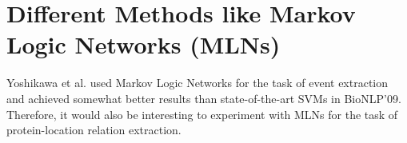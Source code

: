 \section{Different Methods like Markov Logic Networks (MLNs)}


Yoshikawa et al. used Markov Logic Networks \cite{yoshikawa2011coreference} for the task of event extraction and achieved somewhat better results than state-of-the-art SVMs in BioNLP'09. Therefore, it would also be interesting to experiment with MLNs for the task of protein-location relation extraction.